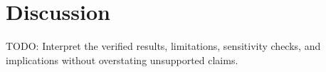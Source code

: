 \section{Discussion}

TODO: Interpret the verified results, limitations, sensitivity checks, and implications without overstating unsupported claims.
